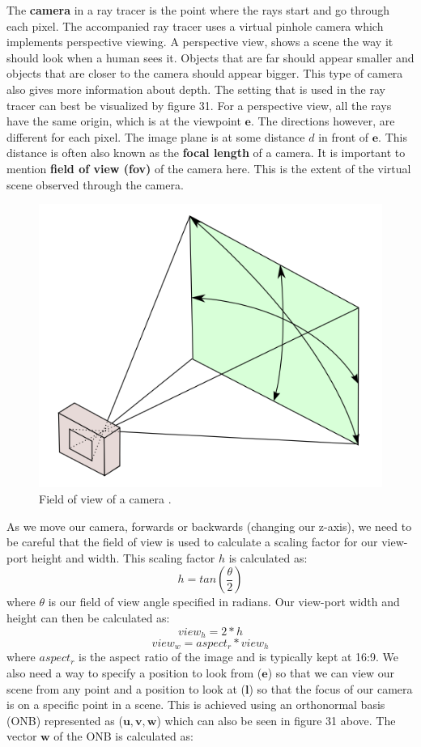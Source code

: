 \documentclass[11pt,a4paper]{article}
\begin{document}
	The \textbf{camera} in a ray tracer is the point where the rays start and go through each pixel. The accompanied ray tracer uses a virtual pinhole camera which implements perspective viewing. A perspective view, shows a scene the way it should look when a human sees it. Objects that are far should appear smaller and objects that are closer to the camera should appear bigger. This type of camera also gives more information about depth. The setting that is used in the ray tracer can best be visualized by figure 31.
	For a perspective view, all the rays have the same origin, which is at the viewpoint $\boldsymbol{e}$. The directions however, are different for each pixel. The image plane is at some distance $d$ in front of $\boldsymbol{e}$. This distance is often also known as the \textbf{focal length} of a camera. It is important to mention \textbf{field of view (fov)} of the camera here. This is the extent of the virtual scene observed through the camera. 
	\begin{figure}[H]
		\centering
		\captionsetup{justification=centering}
		\includegraphics[width=.25\textwidth]{fov.png}\quad
		\caption{Field of view of a camera \protect\cite{fieldofview}.}
	\end{figure}
	\noindent
	As we move our camera, forwards or backwards (changing our z-axis), we need to be careful that the field of view is used to calculate a scaling factor for our view-port height and width. This scaling factor $h$ is calculated as:
	\begin{equation}
		h = tan\left(\frac{\theta}{2}\right)
	\end{equation}
	\noindent
	where $\theta$ is our field of view angle specified in radians. Our view-port width and height can then be calculated as:
	\begin{equation}
		view_{h} = 2 * h
	\end{equation}
	\begin{equation}
	view_{w} = aspect_{r} * view_{h}
	\end{equation}
	\noindent
	where $aspect_{r}$ is the aspect ratio of the image and is typically kept at 16:9. We also need a way to specify a position to look from ($\boldsymbol{e}$) so that we can view our scene from any point and a position to look at ($\boldsymbol{l}$) so that the focus of our camera is on a specific point in a scene. This is achieved using an orthonormal basis (ONB) represented as ($\boldsymbol{u, v, w}$) which can also be seen in figure 31 above. The vector $\boldsymbol{w}$ of the ONB is calculated as:
\end{document}
